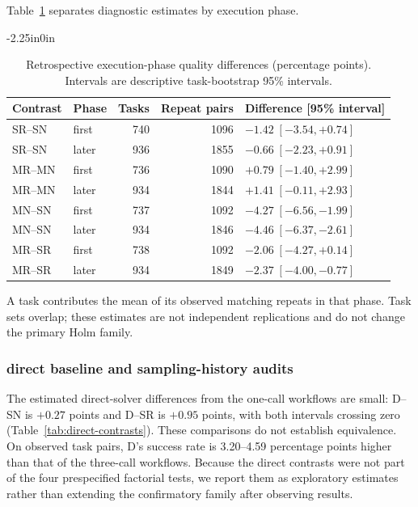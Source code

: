 \documentclass[10pt,letterpaper]{article}
\begin{document}
Table~\ref{tab:temporal-diagnostics} separates diagnostic estimates by execution phase.

\FloatBarrier
\begin{table}[!ht]
\begin{adjustwidth}{-2.25in}{0in}
\caption{Retrospective execution-phase quality differences (percentage points). Intervals are descriptive task-bootstrap 95\% intervals.}
\label{tab:temporal-diagnostics}
\centering\small
\begin{tabular}{@{}llrrl@{}}\toprule
Contrast & Phase & Tasks & Repeat pairs & Difference [95\% interval]\\
\midrule
SR--SN & first & 740 & 1096 & $-1.42\;[-3.54, +0.74]$\\
SR--SN & later & 936 & 1855 & $-0.66\;[-2.23, +0.91]$\\
MR--MN & first & 736 & 1090 & $+0.79\;[-1.40, +2.99]$\\
MR--MN & later & 934 & 1844 & $+1.41\;[-0.11, +2.93]$\\
MN--SN & first & 737 & 1092 & $-4.27\;[-6.56, -1.99]$\\
MN--SN & later & 934 & 1846 & $-4.46\;[-6.37, -2.61]$\\
MR--SR & first & 738 & 1092 & $-2.06\;[-4.27, +0.14]$\\
MR--SR & later & 934 & 1849 & $-2.37\;[-4.00, -0.77]$\\
\bottomrule\end{tabular}
\par\smallskip\noindent A task contributes the mean of its observed matching repeats in that phase. Task sets overlap; these estimates are not independent replications and do not change the primary Holm family.
\end{adjustwidth}
\end{table}
\FloatBarrier


\subsubsection*{direct baseline and sampling-history audits}
The estimated direct-solver differences from the one-call workflows are small: D--SN is $+0.27$ points and D--SR is $+0.95$ points, with both intervals crossing zero (Table~\ref{tab:direct-contrasts}). These comparisons do not establish equivalence. On observed task pairs, D's success rate is 3.20--4.59 percentage points higher than that of the three-call workflows. Because the direct contrasts were not part of the four prespecified factorial tests, we report them as exploratory estimates rather than extending the confirmatory family after observing results.
\end{document}
